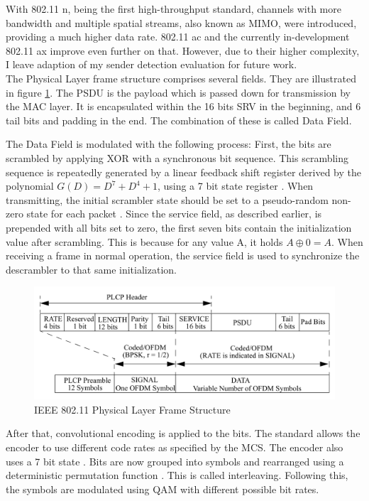 With 802.11 n, being the first high-throughput standard, channels with more bandwidth and multiple spatial streams, also known as \gls{MIMO}, were introduced, providing a much higher data rate. 802.11 ac and the currently in-development 802.11 ax improve even further on that. However, due to their higher complexity, I leave adaption of my sender detection evaluation for future work.\\

The Physical Layer frame structure comprises several fields. They are illustrated in figure \ref{fig:phy-format}. The \gls{PSDU} is the payload which is passed down for transmission by the \gls{MAC} layer. It is encapsulated within the 16 bits \gls{SRV} in the beginning, and 6 tail bits and padding in the end. The combination of these is called Data Field.

The Data Field is modulated with the following process: First, the bits are scrambled by applying XOR with a synchronous bit sequence. This scrambling sequence is repeatedly generated by a linear feedback shift register derived by the polynomial $G(D)=D^7+D^4+1$, using a 7 bit state register \cite{ieee2012}. When transmitting, the initial scrambler state should be set to a pseudo-random non-zero state for each packet \cite{ieee2012}. Since the service field, as described earlier, is prepended with all bits set to zero, the first seven bits contain the initialization value after scrambling. This is because for any value A, it holds $A \oplus 0 = A$. When receiving a frame in normal operation, the service field is used to synchronize the descrambler to that same initialization.

\begin{figure}[H]
	\centering
	\includegraphics[width=\textwidth]{gfx/images/phy-format}
	\caption[IEEE 802.11 Physical Layer Frame Structure]{IEEE 802.11 Physical Layer Frame Structure \cite{ieee2012}}
	\label{fig:phy-format}
\end{figure}

After that, convolutional encoding is applied to the bits. The standard allows the encoder to use different code rates as specified by the \gls{MCS}. The encoder also uses a 7 bit state \cite{park2009}. Bits are now grouped into symbols and rearranged using a deterministic permutation function \cite{perahia2013}. This is called interleaving. Following this, the symbols are modulated using \gls{QAM}	with different possible bit rates.\\

